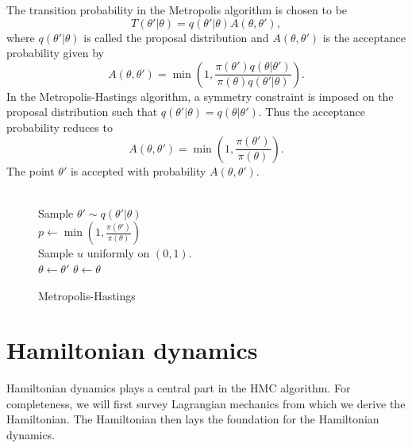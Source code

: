 The transition probability in the Metropolis algorithm is chosen to be
\begin{equation}
  T(\theta'|\theta) = q(\theta'|\theta)A(\theta,\theta'),
\end{equation}
where $q(\theta'|\theta)$ is called the proposal distribution and $A(\theta, \theta')$ is the acceptance probability given by
\begin{equation}
  A(\theta, \theta') = \min \left(1, \frac{\pi(\theta')q(\theta|\theta')}{\pi(\theta)q(\theta'|\theta)}\right).
\end{equation}
In the Metropolis-Hastings algorithm, a symmetry constraint is imposed on the proposal distribution such that 
$q(\theta'|\theta) = q(\theta|\theta')$. Thus the acceptance probability reduces to
\begin{equation}
  A(\theta, \theta') = \min \left(1, \frac{\pi(\theta')}{\pi(\theta)}\right).
\end{equation}
The point $\theta'$ is accepted with probability $A(\theta, \theta')$. 
\begin{figure}[H]
  \begin{algorithm}[H]
    \caption{Metropolis-Hastings}
    \begin{algorithmic}
      \\
      \State Sample $\theta' \sim q(\theta'|\theta)$\\
      \State $p \leftarrow \min \left(1, \frac{\pi(\theta')}{\pi(\theta)}\right)$\\
      \State Sample $u$ uniformly on $(0,1)$. \\
        \State $\theta \leftarrow \theta'$ 
      \Else
        \State $\theta \leftarrow \theta$  
      \EndIf\\
      \EndProcedure
    \end{algorithmic}
  \end{algorithm}
\end{figure}

\section{Hamiltonian dynamics}\label{sec:hamiltonian_dynamics}
Hamiltonian dynamics \cite{classical_mechanics} plays a central part in the HMC algorithm. For completeness, we will first survey Lagrangian mechanics from which we derive the Hamiltonian. The Hamiltonian then lays the foundation for the Hamiltonian dynamics.

